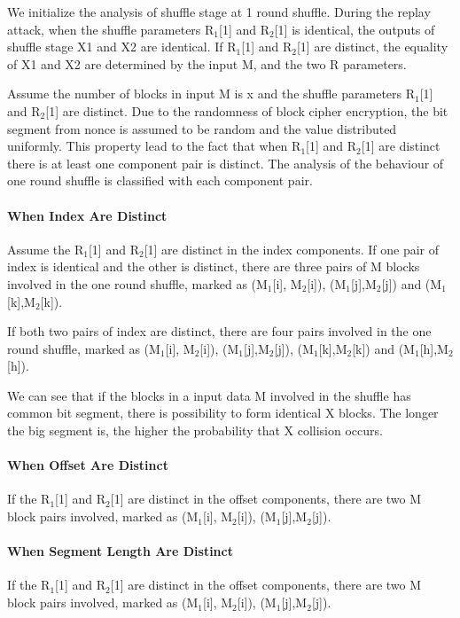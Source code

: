 \documentclass{article}
\begin{document}
We initialize the analysis of shuffle stage at 1 round shuffle. During the
replay attack, when the shuffle
parameters R$_1$[1] and R$_2$[1] is identical, the outputs of shuffle stage X1
and X2 are identical. If R$_1$[1] and R$_2$[1] are distinct, the equality of X1
and X2 are determined by the input M, and the two R parameters.

Assume the number of blocks in input M is x and the shuffle parameters R$_1$[1]
and R$_2$[1] are distinct. Due to the randomness of block cipher encryption, the
bit segment from nonce is assumed to be random and the value distributed
uniformly. This property lead to the fact that when R$_1$[1]
and R$_2$[1] are distinct there is at least one component pair is distinct. The
analysis of the behaviour of one round shuffle is classified with each component
pair. 
\paragraph{When Index Are Distinct}
Assume the R$_1$[1] and R$_2$[1] are distinct in the index components. If one
pair of index is identical and the other is distinct, there are three pairs of M
blocks involved in the one round shuffle, marked as (M$_1$[i], M$_2$[i]),
(M$_1$[j],M$_2$[j]) and (M$_1$[k],M$_2$[k]).

If both two pairs of index are distinct, there are four pairs involved in the
one round shuffle, marked as (M$_1$[i], M$_2$[i]),
(M$_1$[j],M$_2$[j]), (M$_1$[k],M$_2$[k]) and (M$_1$[h],M$_2$[h]).

We can see that if the blocks in a input data M involved in the shuffle has
common bit segment, there is possibility to form identical X blocks.
The longer the big segment is, the higher the probability that X collision
occurs.
\paragraph{When Offset Are Distinct}
If the R$_1$[1] and R$_2$[1] are distinct in the offset components, there are
two M block pairs involved, marked as (M$_1$[i], M$_2$[i]),
(M$_1$[j],M$_2$[j]). 
\paragraph{When Segment Length Are Distinct}
If the R$_1$[1] and R$_2$[1] are distinct in the offset components, there are
two M block pairs involved, marked as (M$_1$[i], M$_2$[i]),
(M$_1$[j],M$_2$[j]). 
\end{document}
